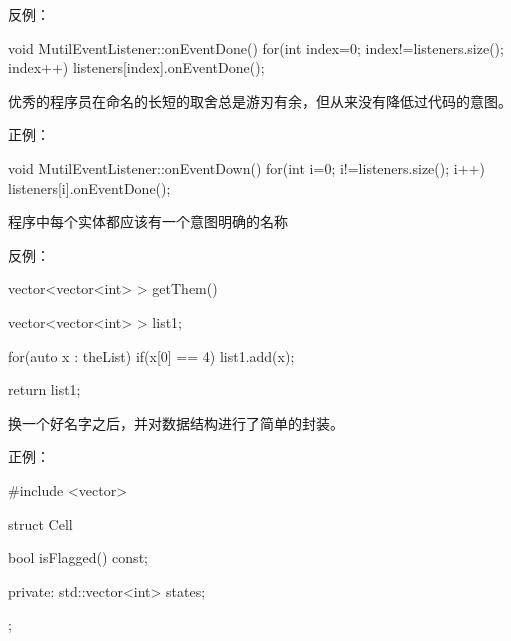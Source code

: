 \begin{content}
反例：
\begin{leftbar}
\begin{c++}[caption="trans-dsl/listener/MutilEventListener.cpp"]
void MutilEventListener::onEventDone()
{
    for(int index=0; index!=listeners.size(); index++)
    {
        listeners[index].onEventDone();
    }
}
\end{c++}
\end{leftbar}

优秀的程序员在命名的长短的取舍总是游刃有余，但从来没有降低过代码的意图。

正例：
\begin{leftbar}
\begin{c++}[caption="trans-dsl/listener/MutilEventListener.cpp"]
void MutilEventListener::onEventDown()
{
    for(int i=0; i!=listeners.size(); i++)
    {
        listeners[i].onEventDone();
    }
}
\end{c++}
\end{leftbar}

\begin{regulation}
程序中每个实体都应该有一个意图明确的名称
\end{regulation}

反例：
\begin{leftbar}
\begin{c++}
vector<vector<int> > getThem() 
{
    vector<vector<int> > list1;
    
    for(auto x : theList)
    {
        if(x[0] == 4)
        {   
            list1.add(x);
        }
    }
    
    return list1;
}
\end{c++}
\end{leftbar}

\begin{enum}
\end{enum}

换一个好名字之后，并对数据结构进行了简单的封装。

正例：
\begin{leftbar}
\begin{c++}
#include <vector>

struct Cell
{
    bool isFlagged() const;

private:
    std::vector<int> states;
};


\end{c++}
\end{leftbar}
\end{content}
